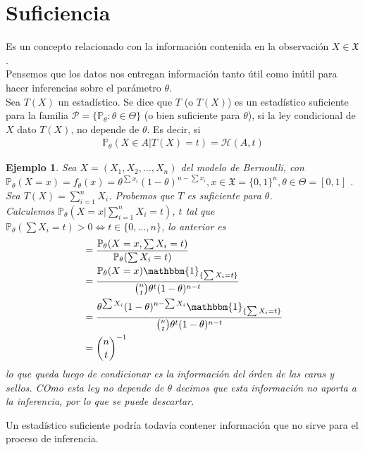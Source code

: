 \documentclass[10pt]{article}
\theoremstyle{plain}
\newtheorem{ej}{Ejemplo}
\theoremstyle{definition}
\begin{document}
\section{Suficiencia}
Es un concepto relacionado con la información contenida en la observación $X \in \mathfrak{X}$.\\
Pensemos que los datos nos entregan información tanto útil como inútil para hacer inferencias sobre el parámetro $\theta$.\\

Sea $T(X)$ un estadístico. Se dice que $T$ (o $T(X)$) es un estadístico suficiente para la familia $\mathcal{P}=\{\mathbb{P}_{\theta}\colon \theta \in \Theta\}$ (o bien suficiente para $\theta$), si la ley condicional de $X$ dato $T(X)$, no depende de $\theta$. Es decir, si
\begin{align*}
\mathbb{P}_{\theta}(X\in A | T(X) = t) = \mathcal{H}(A,t)
\end{align*}
\begin{ej}
Sea $X=(X_{1},X_{2},\ldots,X_{n})$ del modelo de Bernoulli, con $\mathbb{P}_{\theta}(X=x) = f_{\theta}(x) = \theta^{\sum{x_{i}}}(1-\theta)^{n-\sum{x_{i}}}, x \in \mathfrak{X} = \{0,1\}^n, \theta \in \Theta =\left[0,1\right]$ .\\
Sea $T(X) = \sum_{i=1}^n{X_{i}}$. Probemos que $T$ es suficiente para $\theta$.\\
Calculemos $\mathbb{P}_{\theta}(X=x| \sum_{i=1}^n{X_{i}}=t)$,  $t$ tal que $\mathbb{P}_{\theta}(\sum{X_{i}}=t)>0 \Leftrightarrow t \in \{0,\ldots,n\}$, lo anterior es 
\begin{align*}
&= \frac{\mathbb{P}_{\theta}(X=x, \sum{X_{i}}=t)}{\mathbb{P}_{\theta}(\sum{X_{i}}=t)}\\
&= \frac{\mathbb{P}_{\theta}(X=x)\mathbbm{1}_{\{\sum{X_{i}}=t\}}}{\binom{n}{t}\theta^{t}(1-\theta)^{n-t}}\\
&= \frac{\theta^{\sum{X_{i}}}(1-\theta)^{n-\sum{X_{i}}}\mathbbm{1}_{\{\sum{X_{i}}=t\}}}{\binom{n}{t}\theta^{t}(1-\theta)^{n-t}}\\
&= \binom{n}{t}^{-1}
\end{align*}
lo que queda luego de condicionar es la información del órden de las caras y sellos. COmo esta ley no depende de $\theta$ decimos que esta información no aporta a la inferencia, por lo que se puede descartar.\\
\end{ej}
Un estadístico suficiente podría todavía contener información que no sirve para el proceso de inferencia.\\
\end{document}
